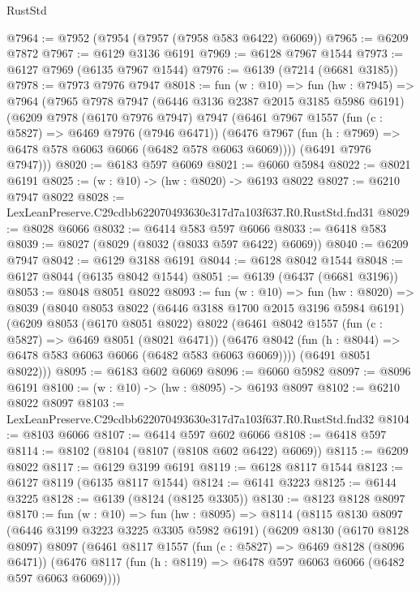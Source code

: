 \begin{lexlean}{RustStd}
\begin{coremodule}
@7964 := @7952 (@7954 (@7957 (@7958 @583 @6422) @6069))
@7965 := @6209 @7872
@7967 := @6129 @3136 @6191
@7969 := @6128 @7967 @1544
@7973 := @6127 @7969 (@6135 @7967 @1544)
@7976 := @6139 (@7214 (@6681 @3185))
@7978 := @7973 @7976 @7947
@8018 := fun (w : @10) =>
  fun (hw : @7945) =>
  @7964
    (@7965
      @7978
      @7947
      (@6446 @3136 @2387 @2015 @3185 @5986 @6191)
      (@6209
        @7978
        (@6170 @7976 @7947)
        @7947
        (@6461
          @7967
          @1557
          (fun (c : @5827) => @6469 @7976 (@7946 @6471))
          (@6476 @7967 (fun (h : @7969) => @6478 @578 @6063 @6066 (@6482 @578 @6063 @6069))))
        (@6491 @7976 @7947)))
@8020 := @6183 @597 @6069
@8021 := @6060 @5984
@8022 := @8021 @6191
@8025 := (w : @10) -> (hw : @8020) -> @6193 @8022
@8027 := @6210 @7947 @8022
@8028 := LexLeanPreserve.C29cdbb622070493630e317d7a103f637.R0.RustStd.fnd31
@8029 := @8028 @6066
@8032 := @6414 @583 @597 @6066
@8033 := @6418 @583
@8039 := @8027 (@8029 (@8032 (@8033 @597 @6422) @6069))
@8040 := @6209 @7947
@8042 := @6129 @3188 @6191
@8044 := @6128 @8042 @1544
@8048 := @6127 @8044 (@6135 @8042 @1544)
@8051 := @6139 (@6437 (@6681 @3196))
@8053 := @8048 @8051 @8022
@8093 := fun (w : @10) =>
  fun (hw : @8020) =>
  @8039
    (@8040
      @8053
      @8022
      (@6446 @3188 @1700 @2015 @3196 @5984 @6191)
      (@6209
        @8053
        (@6170 @8051 @8022)
        @8022
        (@6461
          @8042
          @1557
          (fun (c : @5827) => @6469 @8051 (@8021 @6471))
          (@6476 @8042 (fun (h : @8044) => @6478 @583 @6063 @6066 (@6482 @583 @6063 @6069))))
        (@6491 @8051 @8022)))
@8095 := @6183 @602 @6069
@8096 := @6060 @5982
@8097 := @8096 @6191
@8100 := (w : @10) -> (hw : @8095) -> @6193 @8097
@8102 := @6210 @8022 @8097
@8103 := LexLeanPreserve.C29cdbb622070493630e317d7a103f637.R0.RustStd.fnd32
@8104 := @8103 @6066
@8107 := @6414 @597 @602 @6066
@8108 := @6418 @597
@8114 := @8102 (@8104 (@8107 (@8108 @602 @6422) @6069))
@8115 := @6209 @8022
@8117 := @6129 @3199 @6191
@8119 := @6128 @8117 @1544
@8123 := @6127 @8119 (@6135 @8117 @1544)
@8124 := @6141 @3223
@8125 := @6144 @3225
@8128 := @6139 (@8124 (@8125 @3305))
@8130 := @8123 @8128 @8097
@8170 := fun (w : @10) =>
  fun (hw : @8095) =>
  @8114
    (@8115
      @8130
      @8097
      (@6446 @3199 @3223 @3225 @3305 @5982 @6191)
      (@6209
        @8130
        (@6170 @8128 @8097)
        @8097
        (@6461
          @8117
          @1557
          (fun (c : @5827) => @6469 @8128 (@8096 @6471))
          (@6476 @8117 (fun (h : @8119) => @6478 @597 @6063 @6066 (@6482 @597 @6063 @6069))))

\end{coremodule}
\end{lexlean}
